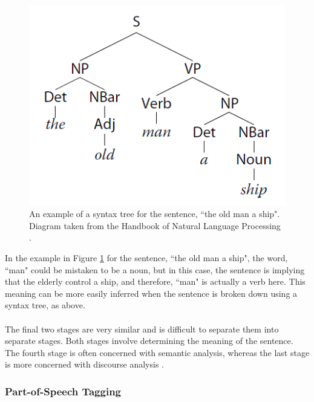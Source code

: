 \documentclass[11pt]{article}
\begin{document}
\begin{center}
\begin{figure}[H]
\begin{center}
  \includegraphics[scale=1]{syntax-tree.png}
  \caption{An example of a syntax tree for the sentence, ``the old man a ship". Diagram taken from the Handbook of Natural Language Processing  \cite{RefWorks:40}.}
  \label{fig:old-man}
  \end{center}
\end{figure}
\end{center}

In the example in Figure \ref{fig:old-man} for the sentence, ``the old man a ship", the word, ``man" could be mistaken to be a noun, but in this case, the sentence is implying that the elderly control a ship, and therefore, ``man" is actually a verb here. This meaning can be more easily inferred when the sentence is broken down using a syntax tree, as above.
\\
\\
The final two stages are very similar and is difficult to separate them into separate stages. Both stages involve determining the meaning of the sentence. The fourth stage is often concerned with semantic analysis, whereas the last stage is more concerned with discourse analysis \cite{RefWorks:39}.

\subsubsection{Part-of-Speech Tagging}
\end{document}

